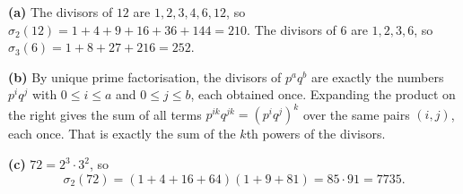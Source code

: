 \textbf{(a)} The divisors of $12$ are $1,2,3,4,6,12$, so $\sigma_2(12)=1+4+9+16+36+144=\boxed{210}$. The divisors of $6$ are $1,2,3,6$, so $\sigma_3(6)=1+8+27+216=\boxed{252}$.

\textbf{(b)} By unique prime factorisation, the divisors of $p^aq^b$ are exactly the numbers $p^iq^j$ with $0\le i\le a$ and $0\le j\le b$, each obtained once. Expanding the product on the right gives the sum of all terms $p^{ik}q^{jk}=\left(p^iq^j\right)^k$ over the same pairs $(i,j)$, each once. That is exactly the sum of the $k$th powers of the divisors.

\textbf{(c)} $72=2^3\cdot3^2$, so
\[\sigma_2(72)=(1+4+16+64)(1+9+81)=85\cdot91=\boxed{7735}.\]
